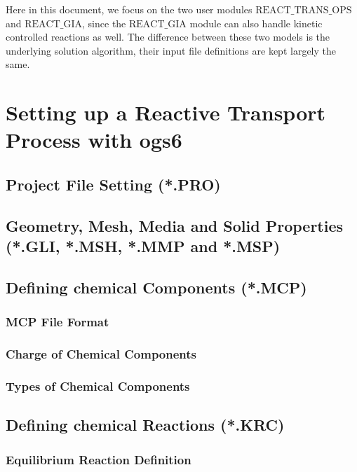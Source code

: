 Here in this document, we focus on the two user modules $\mathrm{REACT\_TRANS\_OPS}$ and $\mathrm{REACT\_GIA}$, since the $\mathrm{REACT\_GIA}$ module can also handle kinetic controlled reactions as well. The difference between these two models is the underlying solution algorithm, their input file definitions are kept largely the same. 

\section{Setting up a Reactive Transport Process with ogs6}

\subsection{Project File Setting (*.PRO)}

\subsection{Geometry, Mesh, Media and Solid Properties (*.GLI, *.MSH, *.MMP and *.MSP)}

\subsection{Defining chemical Components (*.MCP)}

\subsubsection{MCP File Format}

\subsubsection{Charge of Chemical Components}

\subsubsection{Types of Chemical Components}


\subsection{Defining chemical Reactions (*.KRC)}

\subsubsection{Equilibrium Reaction Definition}

